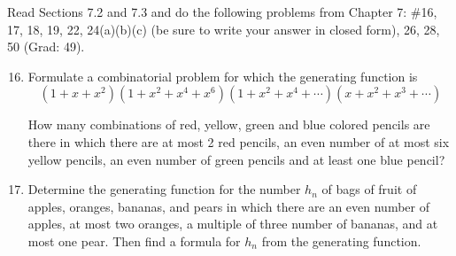 \documentclass{article}
\begin{document}
Read Sections 7.2 and 7.3 and do the following problems from Chapter 7: \#16, 17, 18, 19, 22, 24(a)(b)(c) (be sure to write your answer in closed form), 26, 28, 50 (Grad: 49).
\begin{enumerate}
\setcounter{enumi}{15}
\item
Formulate a combinatorial problem for which the generating function is
\[(1+x+x^2)(1+x^2+x^4+x^6)(1+x^2+x^4+\cdots)(x+x^2+x^3+\cdots)\]

How many combinations of red, yellow, green and blue colored pencils are there in which there are at most 2 red pencils, an even number of at most six yellow pencils, an even number of green pencils and at least one blue pencil?
\item
Determine the generating function  for the number $h_n$ of bags of fruit of apples, oranges, bananas, and pears in which there are an even number of apples, at most two oranges, a multiple of three number of bananas, and at most one pear. Then find a formula for $h_n$ from the generating function.


\end{enumerate}
\end{document}
